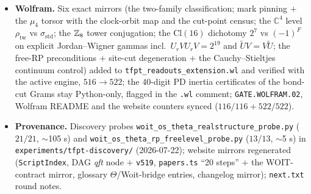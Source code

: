 \begin{itemize}[leftmargin=1.5em]
\texttt{v519\_woit\_theta\_rp\_free.py} is cited via \texttt{veri} in
\texttt{tfpt\_research\_contracts} and \texttt{tfpt\_3}.
\item \textbf{Wolfram.} Six exact mirrors (the two-family classification; mark pinning $+$ the
$\mu_4$ torsor with the clock-orbit map and the cut-point census; the $\mathbb{C}^4$ level
$\rho_{\mathrm{tw}}$ vs $\sigma_{\mathrm{std}}$; the $\mathbb{Z}_8$ tower conjugation; the
$\mathrm{Cl}(16)$ dichotomy $2^7$ vs $(-1)^F$ on explicit Jordan--Wigner gammas incl.\
$U_rVU_rV=2^{19}$ and $\tilde UV=V\tilde U$; the free-RP preconditions $+$ site-cut
degeneration $+$ the Cauchy--Stieltjes continuum control) added to
\texttt{tfpt\_readouts\_extension.wl} and verified with the active engine, $516\to522$; the
$40$-digit PD inertia certificates of the bond-cut Grams stay Python-only, flagged in the
\texttt{.wl} comment; \texttt{GATE.WOLFRAM.02}, Wolfram README and the website counters synced
($116/116+522/522$).
\item \textbf{Provenance.} Discovery probes \texttt{woit\_os\_theta\_realstructure\_probe.py}
($21/21$, $\sim$105 s) and \texttt{woit\_os\_theta\_rp\_freelevel\_probe.py} ($13/13$,
$\sim$5 s) in \texttt{experiments/tfpt-discovery/} (2026-07-22); website mirrors regenerated
(\texttt{ScriptIndex}, DAG \emph{qft} node $+$ \texttt{v519}, \texttt{papers.ts} ``20 steps''
$+$ the WOIT-contract mirror, glossary $\Theta$/Woit-bridge entries, changelog mirror);
\texttt{next.txt} round notes.
\end{itemize}

